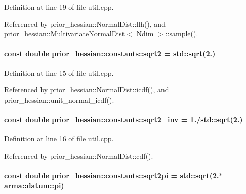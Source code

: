 Definition at line 19 of file util.\+cpp.



Referenced by prior\+\_\+hessian\+::\+Normal\+Dist\+::llh(), and prior\+\_\+hessian\+::\+Multivariate\+Normal\+Dist$<$ Ndim $>$\+::sample().

\paragraph[{\texorpdfstring{sqrt2}{sqrt2}}]{\setlength{\rightskip}{0pt plus 5cm}const double prior\+\_\+hessian\+::constants\+::sqrt2 = std\+::sqrt(2.)}\hypertarget{namespaceprior__hessian_1_1constants_aa1b2e54868f0913edd62e8029b829c43}{}\label{namespaceprior__hessian_1_1constants_aa1b2e54868f0913edd62e8029b829c43}


Definition at line 15 of file util.\+cpp.



Referenced by prior\+\_\+hessian\+::\+Normal\+Dist\+::icdf(), and prior\+\_\+hessian\+::unit\+\_\+normal\+\_\+icdf().

\paragraph[{\texorpdfstring{sqrt2\+\_\+inv}{sqrt2_inv}}]{\setlength{\rightskip}{0pt plus 5cm}const double prior\+\_\+hessian\+::constants\+::sqrt2\+\_\+inv = 1./std\+::sqrt(2.)}\hypertarget{namespaceprior__hessian_1_1constants_a083a6193aeb4fb1a3b244a132d25e1e3}{}\label{namespaceprior__hessian_1_1constants_a083a6193aeb4fb1a3b244a132d25e1e3}


Definition at line 16 of file util.\+cpp.



Referenced by prior\+\_\+hessian\+::\+Normal\+Dist\+::cdf().

\paragraph[{\texorpdfstring{sqrt2pi}{sqrt2pi}}]{\setlength{\rightskip}{0pt plus 5cm}const double prior\+\_\+hessian\+::constants\+::sqrt2pi = std\+::sqrt(2.$\ast$arma\+::datum\+::pi)}\hypertarget{namespaceprior__hessian_1_1constants_a575039e0e575a200b1ba202c452ecbad}{}\label{namespaceprior__hessian_1_1constants_a575039e0e575a200b1ba202c452ecbad}


